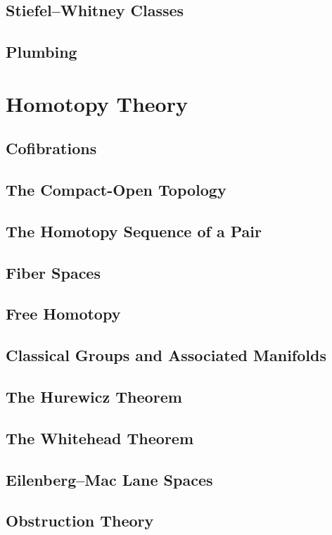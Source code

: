 \documentclass[oneside]{amsbook}
\numberwithin{prob}{section}
\begin{document}
\section{Stiefel--Whitney Classes}

\section{Plumbing}


\chapter{Homotopy Theory}
\section{Cofibrations}

\section{The Compact-Open Topology}

\setcounter{section}{4}
\section{The Homotopy Sequence of a Pair}

\section{Fiber Spaces}

\section{Free Homotopy}

\section{Classical Groups and Associated Manifolds}

\setcounter{section}{9}
\section{The Hurewicz Theorem}

\section{The Whitehead Theorem}

\section{Eilenberg--Mac Lane Spaces}

\section{Obstruction Theory}

\end{document}
